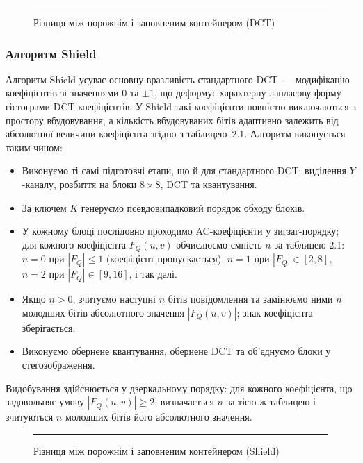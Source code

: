 \begin{figure}[h!]
    \centering
    \rule{0.8\textwidth}{4cm}
    \caption{Різниця між порожнім і заповненим контейнером (DCT)}
    \label{fig:dct-diff}
\end{figure}

\subsubsection*{Алгоритм Shield}

Алгоритм Shield усуває основну вразливість стандартного DCT~--- модифікацію
коефіцієнтів зі значеннями $0$ та $\pm 1$, що деформує характерну
лапласову форму гістограми DCT-коефіцієнтів. У Shield такі коефіцієнти
повністю виключаються з простору вбудовування, а кількість вбудовуваних
бітів адаптивно залежить від абсолютної величини коефіцієнта згідно з
таблицею~2.1. Алгоритм виконується таким чином:
\begin{itemize}
    \item Виконуємо ті самі підготовчі етапи, що й для стандартного DCT:
    виділення $Y$-каналу, розбиття на блоки $8 \times 8$, DCT та
    квантування.
    \item За ключем $K$ генеруємо псевдовипадковий порядок обходу блоків.
    \item У кожному блоці послідовно проходимо AC-коефіцієнти у зигзаг-порядку;
    для кожного коефіцієнта $F_Q(u, v)$ обчислюємо ємність $n$ за таблицею
    2.1: $n = 0$ при $|F_Q| \le 1$ (коефіцієнт пропускається), $n = 1$ при
    $|F_Q| \in [2, 8]$, $n = 2$ при $|F_Q| \in [9, 16]$, і так далі.
    \item Якщо $n > 0$, зчитуємо наступні $n$ бітів повідомлення та
    замінюємо ними $n$ молодших бітів абсолютного значення $|F_Q(u, v)|$;
    знак коефіцієнта зберігається.
    \item Виконуємо обернене квантування, обернене DCT та об'єднуємо блоки
    у стегозображення.
\end{itemize}
Видобування здійснюється у дзеркальному порядку: для кожного коефіцієнта,
що задовольняє умову $|F_Q(u, v)| \ge 2$, визначається $n$ за тією ж
таблицею і зчитуються $n$ молодших бітів його абсолютного значення.

\begin{figure}[h!]
    \centering
    \rule{0.8\textwidth}{4cm}
    \caption{Різниця між порожнім і заповненим контейнером (Shield)}
    \label{fig:shield-diff}
\end{figure}

